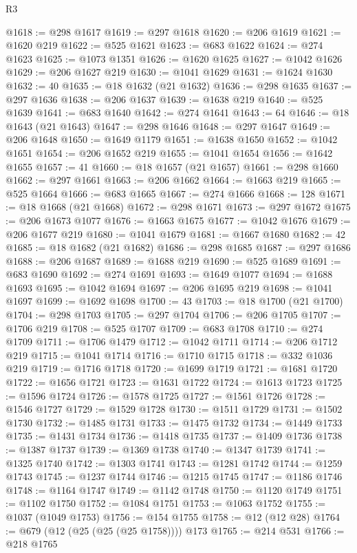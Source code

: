 \begin{lexlean}{R3}
\begin{coremodule}
@1618 := @298 @1617
@1619 := @297 @1618
@1620 := @206 @1619
@1621 := @1620 @219
@1622 := @525 @1621
@1623 := @683 @1622
@1624 := @274 @1623
@1625 := @1073 @1351
@1626 := @1620 @1625
@1627 := @1042 @1626
@1629 := @206 @1627 @219
@1630 := @1041 @1629
@1631 := @1624 @1630
@1632 := 40
@1635 := @18 @1632 (@21 @1632)
@1636 := @298 @1635
@1637 := @297 @1636
@1638 := @206 @1637
@1639 := @1638 @219
@1640 := @525 @1639
@1641 := @683 @1640
@1642 := @274 @1641
@1643 := 64
@1646 := @18 @1643 (@21 @1643)
@1647 := @298 @1646
@1648 := @297 @1647
@1649 := @206 @1648
@1650 := @1649 @1179
@1651 := @1638 @1650
@1652 := @1042 @1651
@1654 := @206 @1652 @219
@1655 := @1041 @1654
@1656 := @1642 @1655
@1657 := 41
@1660 := @18 @1657 (@21 @1657)
@1661 := @298 @1660
@1662 := @297 @1661
@1663 := @206 @1662
@1664 := @1663 @219
@1665 := @525 @1664
@1666 := @683 @1665
@1667 := @274 @1666
@1668 := 128
@1671 := @18 @1668 (@21 @1668)
@1672 := @298 @1671
@1673 := @297 @1672
@1675 := @206 @1673 @1077
@1676 := @1663 @1675
@1677 := @1042 @1676
@1679 := @206 @1677 @219
@1680 := @1041 @1679
@1681 := @1667 @1680
@1682 := 42
@1685 := @18 @1682 (@21 @1682)
@1686 := @298 @1685
@1687 := @297 @1686
@1688 := @206 @1687
@1689 := @1688 @219
@1690 := @525 @1689
@1691 := @683 @1690
@1692 := @274 @1691
@1693 := @1649 @1077
@1694 := @1688 @1693
@1695 := @1042 @1694
@1697 := @206 @1695 @219
@1698 := @1041 @1697
@1699 := @1692 @1698
@1700 := 43
@1703 := @18 @1700 (@21 @1700)
@1704 := @298 @1703
@1705 := @297 @1704
@1706 := @206 @1705
@1707 := @1706 @219
@1708 := @525 @1707
@1709 := @683 @1708
@1710 := @274 @1709
@1711 := @1706 @1479
@1712 := @1042 @1711
@1714 := @206 @1712 @219
@1715 := @1041 @1714
@1716 := @1710 @1715
@1718 := @332 @1036 @219
@1719 := @1716 @1718
@1720 := @1699 @1719
@1721 := @1681 @1720
@1722 := @1656 @1721
@1723 := @1631 @1722
@1724 := @1613 @1723
@1725 := @1596 @1724
@1726 := @1578 @1725
@1727 := @1561 @1726
@1728 := @1546 @1727
@1729 := @1529 @1728
@1730 := @1511 @1729
@1731 := @1502 @1730
@1732 := @1485 @1731
@1733 := @1475 @1732
@1734 := @1449 @1733
@1735 := @1431 @1734
@1736 := @1418 @1735
@1737 := @1409 @1736
@1738 := @1387 @1737
@1739 := @1369 @1738
@1740 := @1347 @1739
@1741 := @1325 @1740
@1742 := @1303 @1741
@1743 := @1281 @1742
@1744 := @1259 @1743
@1745 := @1237 @1744
@1746 := @1215 @1745
@1747 := @1186 @1746
@1748 := @1164 @1747
@1749 := @1142 @1748
@1750 := @1120 @1749
@1751 := @1102 @1750
@1752 := @1084 @1751
@1753 := @1063 @1752
@1755 := @1037 (@1049 @1753)
@1756 := @154 @1755
@1758 := @12 (@12 @28)
@1764 := @679 (@12 (@25 (@25 (@25 @1758)))) @173
@1765 := @214 @531
@1766 := @218 @1765

\end{coremodule}
\end{lexlean}
